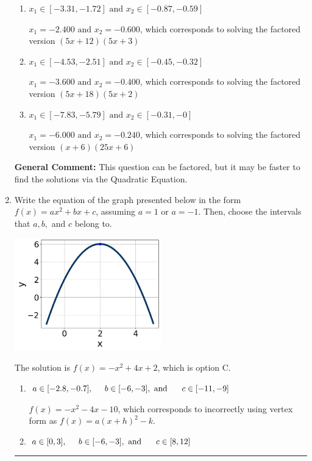 \documentclass{extbook}[14pt]
\newcommand{\litem}[1]{\item #1

\rule{\textwidth}{0.4pt}}
\begin{document}
\begin{enumerate}
{\begin{enumerate}[label=\Alph*.]
* $x_1 = -1.200 \text{ and } x_2 = -1.200$, which is the correct option. Obtained by solving the factored version $(5x + 6)(5x + 6)$
\item \( x_1 \in [-3.31, -1.72] \text{ and } x_2 \in [-0.87, -0.59] \)

$x_1 = -2.400 \text{ and } x_2 = -0.600$, which corresponds to solving the factored version $(5x + 12)(5x + 3)$
\item \( x_1 \in [-4.53, -2.51] \text{ and } x_2 \in [-0.45, -0.32] \)

$x_1 = -3.600 \text{ and } x_2 = -0.400$, which corresponds to solving the factored version $(5x + 18)(5x + 2)$
\item \( x_1 \in [-7.83, -5.79] \text{ and } x_2 \in [-0.31, -0] \)

$x_1 = -6.000 \text{ and } x_2 = -0.240$, which corresponds to solving the factored version $(x + 6)(25x + 6)$
\end{enumerate}

\textbf{General Comment:} This question can be factored, but it may be faster to find the solutions via the Quadratic Equation.
}
\litem{
Write the equation of the graph presented below in the form $f(x)=ax^2+bx+c$, assuming  $a=1$ or $a=-1$. Then, choose the intervals that $a, b,$ and $c$ belong to.

\begin{center}
    \includegraphics[width=0.5\textwidth]{../Figures/quadraticGraphToEquationCopyB.png}
\end{center}


The solution is \( f(x) = -x^{2} +4 x + 2 \), which is option C.\begin{enumerate}[label=\Alph*.]
\item \( a \in [-2.8, -0.7], \hspace*{5mm} b \in [-6, -3], \text{ and } \hspace*{5mm} c \in [-11, -9] \)

$f(x)=-x^{2} -4 x -10$, which corresponds to incorrectly using vertex form as $f(x) = a(x+h)^2 - k$.
\item \( a \in [0, 3], \hspace*{5mm} b \in [-6, -3], \text{ and } \hspace*{5mm} c \in [8, 12] \)


\end{enumerate}}
\end{enumerate}
\end{document}
